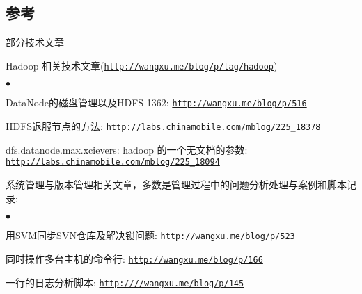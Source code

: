 \documentclass[margin,line]{res}
\newenvironment{list1}{
  \begin{list}{\ding{113}}{%
      \setlength{\itemsep}{0in}
      \setlength{\parsep}{0in} \setlength{\parskip}{0in}
      \setlength{\topsep}{0in} \setlength{\partopsep}{0in} 
      \setlength{\leftmargin}{0.17in}}}{\end{list}}
\newenvironment{list2}{
  \begin{list}{$\bullet$}{%
      \setlength{\itemsep}{0in}
      \setlength{\parsep}{0in} \setlength{\parskip}{0in}
      \setlength{\topsep}{0in} \setlength{\partopsep}{0in} 
      \setlength{\leftmargin}{0.2in}}}{\end{list}}
\newcommand{\http}{http:/\hspace{-0.3ex}/}
\newcommand{\hindent}{\mbox{\hspace{8ex}}}
\begin{document}
\begin{resume}
\section{参考}
\textsf{部分技术文章}\\
\vspace*{-.1in}
\begin{list1}
\item[] Hadoop 相关技术文章(\href{http://wangxu.me/blog/p/tag/hadoop}{\tt\http{}wangxu.me/blog/p/tag/hadoop})
\begin{list2}
\vspace*{.05in}
\item DataNode的磁盘管理以及HDFS-1362: \href{http://wangxu.me/blog/p/516}{\tt\http{}wangxu.me/blog/p/516}
\item HDFS退服节点的方法: \href{http://labs.chinamobile.com/mblog/225_18378}{\tt\http{}labs.chinamobile.com/mblog/225\_18378}
\item dfs.datanode.max.xcievers: hadoop 的一个无文档的参数: \\
	\hindent\href{http://labs.chinamobile.com/mblog/225_18094}{\tt\http{}labs.chinamobile.com/mblog/225\_18094}
\vspace*{.05in}
\end{list2}
\item[] 系统管理与版本管理相关文章，多数是管理过程中的问题分析处理与案例和脚本记录:
\begin{list2}
\vspace*{.05in}
\item 用SVM同步SVN仓库及解决锁问题: \href{http://wangxu.me/blog/p/523}{\tt\http{}wangxu.me/blog/p/523}
\item 同时操作多台主机的命令行: \href{http://wangxu.me/blog/p/166}{\tt\http{}wangxu.me/blog/p/166}
\item 一行的日志分析脚本: \href{http://wangxu.me/blog/p/145}{\tt\http{}//wangxu.me/blog/p/145}
\vspace*{.05in}
\end{list2}
\end{list1}


\end{resume}
\end{document}
